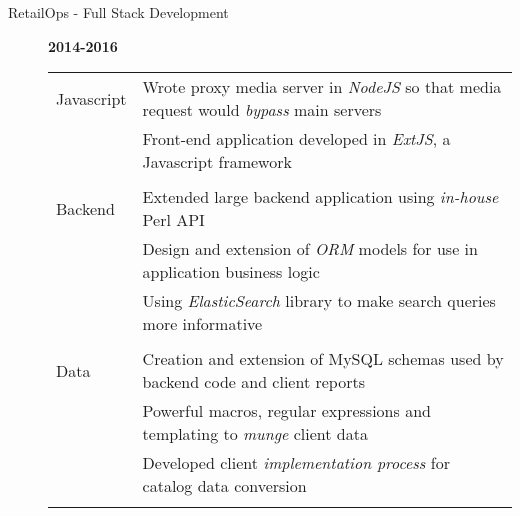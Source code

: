 \documentclass[12pt]{article}
\begin{document}
\begin{description}
\begin{description}
                \item[RetailOps - Full Stack Development] \hfill \textbf{2014-2016}\\
                    \begin{tabular}{l|l}
				\\[-1.0mm]
                        Javascript & Wrote proxy media server in \textit{NodeJS} so that media request would \textit{bypass} main servers \\
				   & Front-end application developed in \textit{ExtJS}, a Javascript framework\\
				\\[-1.7mm]
                        Backend    & Extended large backend application using \textit{in-house} Perl API \\
                                   & Design and extension of \textit{ORM} models for use in application business logic \\
                                   & Using \textit{ElasticSearch} library to make search queries more informative\\
				\\[-1.7mm]
                        Data       & Creation and extension of MySQL schemas used by backend code and client reports\\
                                   & Powerful macros, regular expressions and templating to \textit{munge} client data\\
                        	   & Developed client \textit{implementation process} for catalog data conversion\\
				\\[-1.0mm]
                    \end{tabular}
            \end{description}


\end{description}
\end{document}

